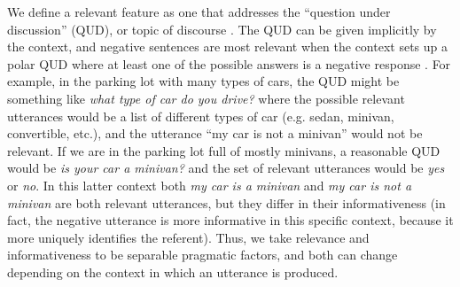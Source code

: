 \documentclass[man, floatsintext, noapacite]{apa6}
\begin{document}
We define a relevant feature as one that addresses the ``question under discussion'' (QUD), or topic of discourse \cite{roberts2012, vanrooy2003}. The QUD can be given implicitly by the context, and negative sentences are most relevant when the context sets up a polar QUD where at least one of the possible answers is a negative response \cite{xiang2020}. For example, in the parking lot with many types of cars, the QUD might be something like \textit{what type of car do you drive?} where the possible relevant utterances would be a list of different types of car (e.g. sedan, minivan, convertible, etc.), and the utterance ``my car is not a minivan'' would not be relevant. If we are in the parking lot full of mostly minivans, a reasonable QUD would be \textit{is your car a minivan?} and the set of relevant utterances would be \textit{yes} or \textit{no}. In this latter context both \textit{my car is a minivan} and \textit{my car is not a minivan} are both relevant utterances, but they differ in their informativeness (in fact, the negative utterance is more informative in this specific context, because it more uniquely identifies the referent). Thus, we take relevance and informativeness to be separable pragmatic factors, and both can change depending on the context in which an utterance is produced.

\end{document}
